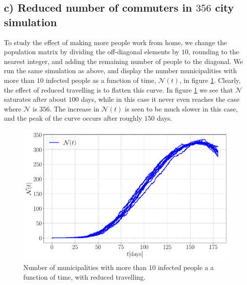 \subsection{c) Reduced number of commuters in $356$ city simulation}

To study the effect of making more people work from home, we change the population matrix by dividing the off-diagonal elements by $10$, rounding to the nearest integer, and adding the remaining number of people to the diagonal. We run the same simulation as above, and display the number municipalities with more than $10$ infected people as a function of time, $\mathcal{N}(t)$,  in figure \ref{fig:infected_Ec}. Clearly, the effect of reduced travelling is to flatten this curve. In figure \ref{fig:infected_Ec} we see that $\mathcal{N}$ saturates after about $100$ days, while in this case it never even reaches the case where $\mathcal{N}$ is $356$. The increase in $\mathcal{N}(t)$ is seen to be much slower in this case, and the peak of the curve occurs after roughly $150$ days. 


\begin{figure}[htb]
	\centering
	\includegraphics[width=0.9\columnwidth]{../fig/2Ec_N.pdf}
	\caption{Number of municipalities with more than $10$ infected people a a function of time, with reduced travelling.}
	\label{fig:infected_Ec}
\end{figure}
